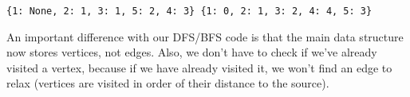 \begin{Verbatim}
{1: None, 2: 1, 3: 1, 5: 2, 4: 3} {1: 0, 2: 1, 3: 2, 4: 4, 5: 3}

\end{Verbatim}


An important difference with our DFS/BFS code is that the main data structure now stores vertices, not edges.
Also, we don't have to check if we've already visited a vertex, because if we have already visited it, we won't find an edge to relax (vertices are visited in order of their distance to the source).
